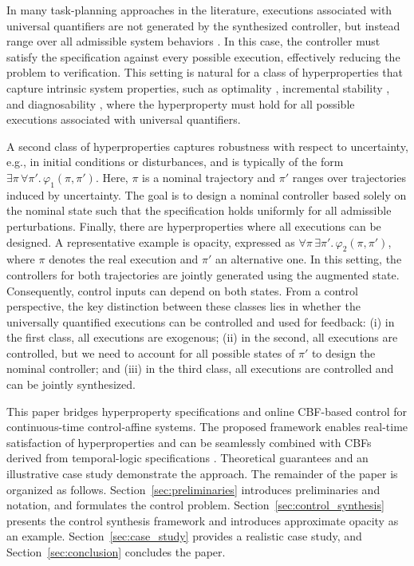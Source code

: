 \documentclass[letterpaper, 10 pt, conference]{ieeeconf}  %
\begin{document}
In many task-planning approaches in the literature, executions associated with universal quantifiers are not generated by the synthesized controller, but instead range over all admissible system behaviors \cite{wang2020, zhao2025}. In this case, the controller must satisfy the specification against every possible execution, effectively reducing the problem to verification. This setting is natural for a class of hyperproperties that capture intrinsic system properties, such as optimality \cite{wang2020}, incremental stability \cite{angeli2002}, and diagnosability \cite{zhao2024}, where the hyperproperty must hold for all possible executions associated with universal quantifiers.

A second class of hyperproperties captures robustness with respect to uncertainty, e.g., in initial conditions or disturbances, and is typically of the form $\exists \pi \, \forall \pi'. \, \varphi_1(\pi,\pi')$. Here, $\pi$ is a nominal trajectory and $\pi'$ ranges over trajectories induced by uncertainty. The goal is to design a nominal controller based solely on the nominal state such that the specification holds uniformly for all admissible perturbations. Finally, there are hyperproperties where all executions can be designed. A representative example is opacity, expressed as $\forall \pi \, \exists \pi'. \, \varphi_2(\pi,\pi')$, where $\pi$ denotes the real execution and $\pi'$ an alternative one. In this setting, the controllers for both trajectories are jointly generated using the augmented state. Consequently, control inputs can depend on both states. From a control perspective, the key distinction between these classes lies in whether the universally quantified executions can be controlled and used for feedback: (i) in the first class, all executions are exogenous; (ii) in the second, all executions are controlled, but we need to account for all possible states of $\pi'$ to design the nominal controller; and (iii) in the third class, all executions are controlled and can be jointly synthesized.

This paper bridges hyperproperty specifications and online CBF-based control for continuous-time control-affine systems. The proposed framework enables real-time satisfaction of hyperproperties and can be seamlessly combined with CBFs derived from temporal-logic specifications \cite{srinivasan2021, lindemann2019}. Theoretical guarantees and an illustrative case study demonstrate the approach. The remainder of the paper is organized as follows. Section~\ref{sec:preliminaries} introduces preliminaries and notation, and formulates the control problem. Section~\ref{sec:control_synthesis} presents the control synthesis framework and introduces approximate opacity as an example.
Section~\ref{sec:case_study} provides a realistic case study, and Section~\ref{sec:conclusion} concludes the paper.
\end{document}
